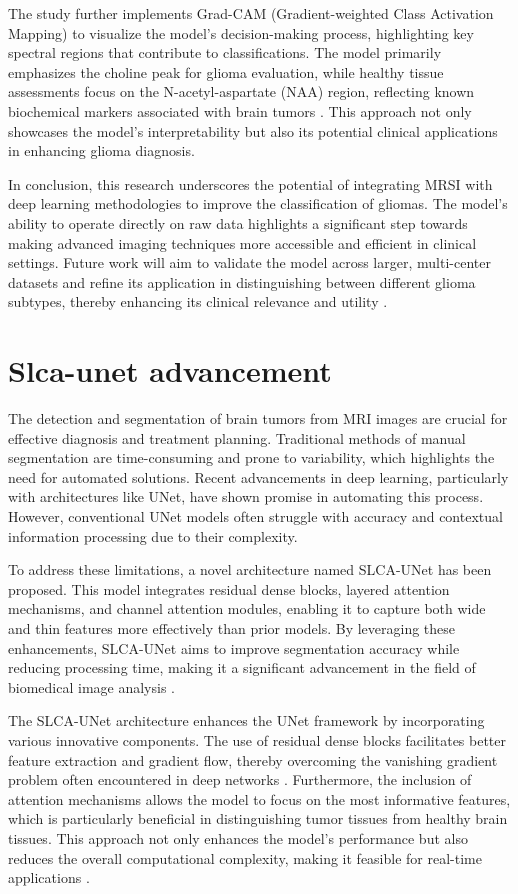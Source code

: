 \documentclass[runningheads]{llncs}
\begin{document}
The study further implements Grad-CAM (Gradient-weighted Class Activation Mapping) to visualize the model's decision-making process, highlighting key spectral regions that contribute to classifications. The model primarily emphasizes the choline peak for glioma evaluation, while healthy tissue assessments focus on the N-acetyl-aspartate (NAA) region, reflecting known biochemical markers associated with brain tumors \cite{Erin_2025}. This approach not only showcases the model's interpretability but also its potential clinical applications in enhancing glioma diagnosis.

In conclusion, this research underscores the potential of integrating MRSI with deep learning methodologies to improve the classification of gliomas. The model's ability to operate directly on raw data highlights a significant step towards making advanced imaging techniques more accessible and efficient in clinical settings. Future work will aim to validate the model across larger, multi-center datasets and refine its application in distinguishing between different glioma subtypes, thereby enhancing its clinical relevance and utility \cite{Erin_2025}.
\section{Slca-unet advancement}
The detection and segmentation of brain tumors from MRI images are crucial for effective diagnosis and treatment planning. Traditional methods of manual segmentation are time-consuming and prone to variability, which highlights the need for automated solutions. Recent advancements in deep learning, particularly with architectures like UNet, have shown promise in automating this process. However, conventional UNet models often struggle with accuracy and contextual information processing due to their complexity. 

To address these limitations, a novel architecture named SLCA-UNet has been proposed. This model integrates residual dense blocks, layered attention mechanisms, and channel attention modules, enabling it to capture both wide and thin features more effectively than prior models. By leveraging these enhancements, SLCA-UNet aims to improve segmentation accuracy while reducing processing time, making it a significant advancement in the field of biomedical image analysis \cite{P.S._2025}.

The SLCA-UNet architecture enhances the UNet framework by incorporating various innovative components. The use of residual dense blocks facilitates better feature extraction and gradient flow, thereby overcoming the vanishing gradient problem often encountered in deep networks \cite{P.S._2025}. Furthermore, the inclusion of attention mechanisms allows the model to focus on the most informative features, which is particularly beneficial in distinguishing tumor tissues from healthy brain tissues. This approach not only enhances the model's performance but also reduces the overall computational complexity, making it feasible for real-time applications \cite{P.S._2025}.
\end{document}
